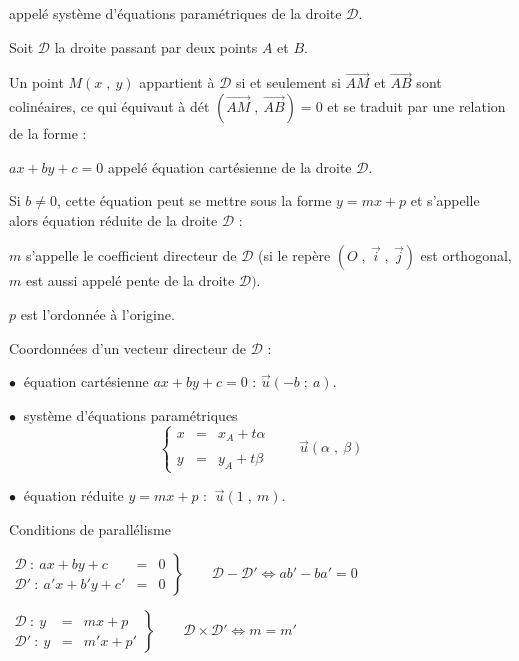 \documentclass{article}
\begin{document}
		appelé système d'équations paramétriques de la droite $\mathcal{D}.$
		
		Soit $\mathcal{D}$ la droite passant par deux points $A$ et $B.$ 
		
		Un point $M(x\;,\ y)$ appartient à $\mathcal{D}$ si et seulement si $\overrightarrow{AM}$ et $\overrightarrow{AB}$ sont colinéaires, ce qui équivaut à dét $ \left(\overrightarrow{AM}\;,\ \overrightarrow{AB}\right)=0$ et se traduit par une relation de la forme : 
		
		$ax+by+c=0$ appelé équation cartésienne de la droite $\mathcal{D}.$
		
		Si $b\neq 0$, cette équation peut se mettre sous la forme $y=mx+p$ et s'appelle alors équation réduite de la droite $\mathcal{D}$ : 
		
		$m$ s'appelle le coefficient directeur de $\mathcal{D}$ (si le repère $(O\;,\ \vec{i}\;,\ \vec{j})$ est orthogonal, $m$ est aussi appelé pente de la droite $\mathcal{D}).$ 
		
		$p$ est l'ordonnée à l'origine.
		
		Coordonnées d'un vecteur directeur de $\mathcal{D}$ :
		
		$\bullet\ $ équation cartésienne $ax+by+c=0$ : $\overrightarrow{u}(-b\;;\ a).$
		
		$\bullet\ $ système d'équations paramétriques $$\left\lbrace\begin{array}{lcl} x& = & x_{A}+t\alpha\\ \\ y& =& y_{A}+t\beta \end{array}\qquad \vec{u}(\alpha\;,\ \beta)\right.$$
		
		$\bullet\ $ équation réduite $y=mx+p$ : $\ \vec{u}(1\;,\ m).$
		
		Conditions de parallélisme
		
		$\left.\begin{array}{lcl} \mathcal{D}\ :\ ax+by+c& = &0\\ \mathcal{D'}\ :\ a'x+b'y+c'& = &0 \end{array}\right\rbrace\qquad\mathcal{D}-\mathcal{D'}\Leftrightarrow ab'-ba'=0$
		
		$\left.\begin{array}{lcl} \mathcal{D}\ :\ y& =& mx+p\\ \mathcal{D'}\ :\ y& =& m'x+p' \end{array}\right\rbrace\qquad\mathcal{D}\times\mathcal{D'}\Leftrightarrow m=m'$
		
\end{document}

